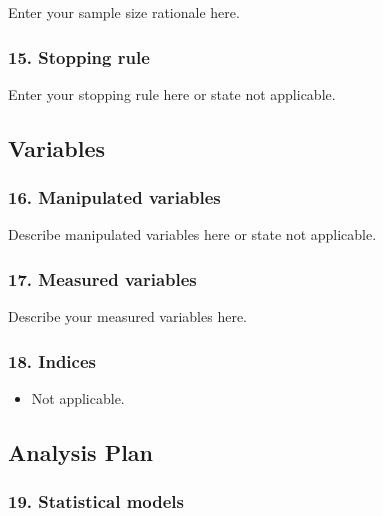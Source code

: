 \documentclass[
]{article}
\providecommand{\tightlist}{%
  \setlength{\itemsep}{0pt}\setlength{\parskip}{0pt}}
\begin{document}
Enter your sample size rationale here.

\hypertarget{stopping-rule}{%
\subsubsection{15. Stopping rule}\label{stopping-rule}}

Enter your stopping rule here or state not applicable.

\hypertarget{variables}{%
\subsection{Variables}\label{variables}}

\hypertarget{manipulated-variables}{%
\subsubsection{16. Manipulated variables}\label{manipulated-variables}}

Describe manipulated variables here or state not applicable.

\hypertarget{measured-variables}{%
\subsubsection{17. Measured variables}\label{measured-variables}}

Describe your measured variables here.

\hypertarget{indices}{%
\subsubsection{18. Indices}\label{indices}}

\begin{itemize}
\tightlist
\item
  Not applicable.
\end{itemize}

\hypertarget{analysis-plan}{%
\subsection{Analysis Plan}\label{analysis-plan}}

\hypertarget{statistical-models}{%
\subsubsection{19. Statistical models}\label{statistical-models}}
\end{document}
